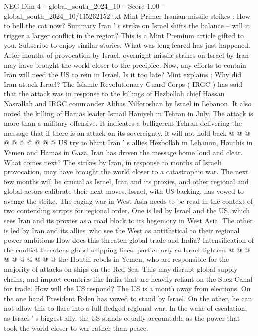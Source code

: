 \begin{textsample}{NEG Dim 4 – global\_south\_2024\_10 – Score 1.00 – global\_south\_2024\_10/115262152.txt}  \label{ex:f4_neg_080}
Mint Primer Iranian missile strikes : How to bell the cat now?
Summary Iran ' s strike on Israel shifts the balance -- will it trigger a larger conflict in the region?
This is a Mint Premium article gifted to you.
Subscribe to enjoy similar stories.
What was long feared has just happened.
After months of provocation by Israel, overnight missile strikes on Israel by Iran may have brought the world closer to the precipice.
Now, any efforts to contain Iran will need the US to rein in Israel.
Is it too late?
Mint explains : Why did Iran attack Israel?
The Islamic Revolutionary Guard Corps ( IRGC ) has said that the attack was in response to the killings of Hezbollah chief Hassan Nasrallah and IRGC commander Abbas Nilforoshan by Israel in Lebanon.
It also noted the killing of Hamas leader Ismail Haniyeh in Tehran in July.
The attack is more than a military offensive.
It indicates a belligerent Tehran delivering the message that if there is an attack on its sovereignty, it will not hold back @ @ @ @ @ @ @ @ @ @ US try to blunt Iran ' s allies Hezbollah in Lebanon, Houthis in Yemen and Hamas in Gaza, Iran has driven the message home loud and clear.
What comes next?
The strikes by Iran, in response to months of Israeli provocation, may have brought the world closer to a catastrophic war.
The next few months will be crucial as Israel, Iran and its proxies, and other regional and global actors calibrate their next moves.
Israel, with US backing, has vowed to avenge the strike.
The raging war in West Asia needs to be read in the context of two contending scripts for regional order.
One is led by Israel and the US, which sees Iran and its proxies as a road block to its hegemony in West Asia.
The other is led by Iran and its allies, who see the West as antithetical to their regional power ambitions How does this threaten global trade and India?
Intensification of the conflict threatens global shipping lines, particularly as Israel tightens @ @ @ @ @ @ @ @ @ @ the Houthi rebels in Yemen, who are responsible for the majority of attacks on ships on the Red Sea.
This may disrupt global supply chains, and impact countries like India that are heavily reliant on the Suez Canal for trade.
How will the US respond?
The US is a month away from elections.
On the one hand President Biden has vowed to stand by Israel.
On the other, he can not allow this to flare into a full-fledged regional war.
In the wake of escalation, as Israel ' s biggest ally, the US stands equally accountable as the power that took the world closer to war rather than peace.

\end{textsample}
